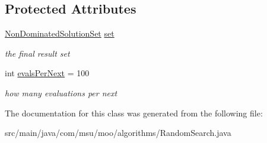 \subsection*{Protected Attributes}
\begin{DoxyCompactItemize}
\item 
\hypertarget{classcom_1_1msu_1_1moo_1_1algorithms_1_1RandomSearch_3_01V_01extends_01IVariable_00_01P_01extends_01IProblem_01_4_adb6dda7177bfe4b7e8690d7fd15685d0}{\hyperlink{classcom_1_1msu_1_1moo_1_1model_1_1solution_1_1NonDominatedSolutionSet}{Non\-Dominated\-Solution\-Set} \hyperlink{classcom_1_1msu_1_1moo_1_1algorithms_1_1RandomSearch_3_01V_01extends_01IVariable_00_01P_01extends_01IProblem_01_4_adb6dda7177bfe4b7e8690d7fd15685d0}{set}}\label{classcom_1_1msu_1_1moo_1_1algorithms_1_1RandomSearch_3_01V_01extends_01IVariable_00_01P_01extends_01IProblem_01_4_adb6dda7177bfe4b7e8690d7fd15685d0}

\begin{DoxyCompactList}\small\item\em the final result set \end{DoxyCompactList}\item 
\hypertarget{classcom_1_1msu_1_1moo_1_1algorithms_1_1RandomSearch_3_01V_01extends_01IVariable_00_01P_01extends_01IProblem_01_4_a99e93b6813c3ed7f5c1efccd6b56da90}{int \hyperlink{classcom_1_1msu_1_1moo_1_1algorithms_1_1RandomSearch_3_01V_01extends_01IVariable_00_01P_01extends_01IProblem_01_4_a99e93b6813c3ed7f5c1efccd6b56da90}{evals\-Per\-Next} = 100}\label{classcom_1_1msu_1_1moo_1_1algorithms_1_1RandomSearch_3_01V_01extends_01IVariable_00_01P_01extends_01IProblem_01_4_a99e93b6813c3ed7f5c1efccd6b56da90}

\begin{DoxyCompactList}\small\item\em how many evaluations per next \end{DoxyCompactList}\end{DoxyCompactItemize}


The documentation for this class was generated from the following file\-:\begin{DoxyCompactItemize}
\item 
src/main/java/com/msu/moo/algorithms/Random\-Search.\-java\end{DoxyCompactItemize}
